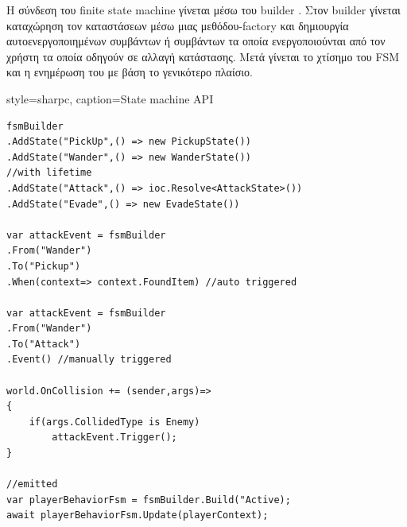 H σύνδεση του finite state machine γίνεται μέσω του builder \cite{Gamma:1995:DPE:186897}. Στον builder γίνεται καταχώρηση τον καταστάσεων μέσω μιας μεθόδου-factory και δημιουργία αυτοενεργοποιημένων συμβάντων ή συμβάντων τα οποία ενεργοποιούνται από τον χρήστη τα οποία οδηγούν σε αλλαγή κατάστασης. Μετά γίνεται το χτίσημο του FSM και η ενημέρωση του με βάση το γενικότερο πλαίσιο.

\newpage
\lstset
{
	style=sharpc, 
	caption={State machine API}
}
\begin{lstlisting}	
fsmBuilder
.AddState("PickUp",() => new PickupState())
.AddState("Wander",() => new WanderState())
//with lifetime
.AddState("Attack",() => ioc.Resolve<AttackState>())
.AddState("Evade",() => new EvadeState())	
		
var attackEvent = fsmBuilder
.From("Wander")
.To("Pickup")
.When(context=> context.FoundItem) //auto triggered
	
var attackEvent = fsmBuilder
.From("Wander")
.To("Attack")
.Event() //manually triggered
	 	
world.OnCollision += (sender,args)=>
{
    if(args.CollidedType is Enemy)
	    attackEvent.Trigger();
}
	 
//emitted	 
var playerBehaviorFsm = fsmBuilder.Build("Active);
await playerBehaviorFsm.Update(playerContext);
	
\end{lstlisting}
